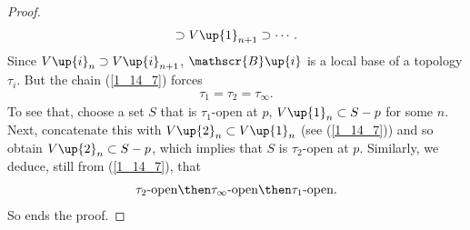 \begin{proof}
\begin{align}
      \supset 
    V\up{1}_{n+1} 
      \supset 
    \cdots .
  \end{align}
%
Since 
  $V\up{i}_n\supset V\up{i}_{n+1}$, 
$\mathscr{B}\up{i}$ is a local base of a topology $\tau_i$. 
But the chain (\ref{1_14_7}) forces %
%
  \begin{align}
    \tau_1 = \tau_2 = \tau_\infty.
  \end{align}
%
To see that, choose a set $S$ that is $\tau_1$-open at $p$, \ie 
%
  $V\up{1}_n \subset S-p$  
%
for some $n$. Next, concatenate this with %
%
  $V\up{2}_n \subset V\up{1}_n$ (see (\ref{1_14_7})) %
%
and so obtain  
%
  $V\up{2}_n \subset S-p$, 
%
which implies that $S$ is $\tau_2$-open at $p$.
Similarly, we deduce, still from (\ref{1_14_7}), that 
\begin{align}
  \tau_2\text{-open} 
    \then 
  \tau_\infty\text{-open} 
    \then 
  \tau_1\text{-open}.
\end{align}
So ends the proof.
\end{proof}





